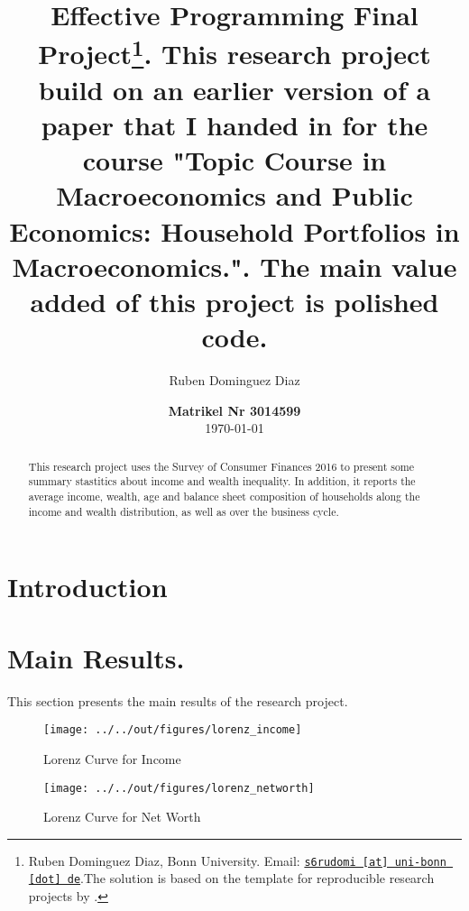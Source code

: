 \documentclass[11pt, a4paper, leqno]{article}
\begin{document}
\title{Effective Programming Final Project\thanks{Ruben Dominguez Diaz, Bonn University. Email: \href{mailto:s6rudomi@uni-bonn.de}{\nolinkurl{s6rudomi [at] uni-bonn [dot] de}}.The solution is based on the template for reproducible research projects by \citet{GaudeckerEconProjectTemplates}.}. This research project build on an earlier version of a paper that I handed in for the course "Topic Course in Macroeconomics and Public Economics: Household Portfolios in Macroeconomics.". The main value added of this project is polished code.}

\author{Ruben Dominguez Diaz}

\date{
{\bf Matrikel Nr 3014599} 
\\[1ex] 
\today
}

\maketitle

\begin{abstract}
	This research project uses the Survey of Consumer Finances 2016 to present some summary stastitics about income and wealth inequality. In addition, it reports the average income, wealth, age and balance sheet composition of households along the income and wealth distribution, as well as over the business cycle.
\end{abstract}
\clearpage

\section{Introduction} 
\label{sec:introduction}

\section{Main Results.}
\label{sec:mainresults}

This section presents the main results of the research project.
\begin{figure}
    \caption{Lorenz Curve for Income}
    
    \texttt{[image: ../../out/figures/lorenz\_income]}
    \label{fig:lorincome}
\end{figure}


\begin{figure}
    \caption{Lorenz Curve for Net Worth}
    
    \texttt{[image: ../../out/figures/lorenz\_networth]}
    \label{fig:lornetworth}

\end{figure}
\end{document}
